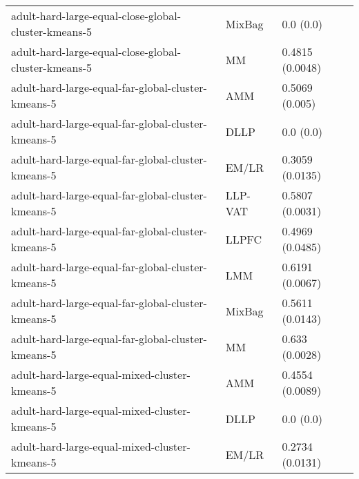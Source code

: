 \begin{longtable}{lll}
                                                         adult-hard-large-equal-close-global-cluster-kmeans-5 &    MixBag &                                 0.0 (0.0) \\
                                                         adult-hard-large-equal-close-global-cluster-kmeans-5 &        MM &                           0.4815 (0.0048) \\
                                                           adult-hard-large-equal-far-global-cluster-kmeans-5 &       AMM &                            0.5069 (0.005) \\
                                                           adult-hard-large-equal-far-global-cluster-kmeans-5 &      DLLP &                                 0.0 (0.0) \\
                                                           adult-hard-large-equal-far-global-cluster-kmeans-5 &     EM/LR &                           0.3059 (0.0135) \\
                                                           adult-hard-large-equal-far-global-cluster-kmeans-5 &   LLP-VAT &                           0.5807 (0.0031) \\
                                                           adult-hard-large-equal-far-global-cluster-kmeans-5 &     LLPFC &                           0.4969 (0.0485) \\
                                                           adult-hard-large-equal-far-global-cluster-kmeans-5 &       LMM &                           0.6191 (0.0067) \\
                                                           adult-hard-large-equal-far-global-cluster-kmeans-5 &    MixBag &                           0.5611 (0.0143) \\
                                                           adult-hard-large-equal-far-global-cluster-kmeans-5 &        MM &                            0.633 (0.0028) \\
                                                                adult-hard-large-equal-mixed-cluster-kmeans-5 &       AMM &                           0.4554 (0.0089) \\
                                                                adult-hard-large-equal-mixed-cluster-kmeans-5 &      DLLP &                                 0.0 (0.0) \\
                                                                adult-hard-large-equal-mixed-cluster-kmeans-5 &     EM/LR &                           0.2734 (0.0131) \\

\end{longtable}
